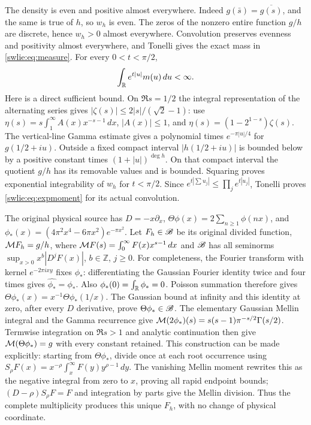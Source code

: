 \documentclass[11pt]{article}
\begin{document}
The density is even and positive almost everywhere. Indeed
$g(\bar s)=\overline{g(s)}$, and the same is true of $h$,
so $w_h$ is even. The zeros of the nonzero entire function
$g/h$ are discrete, hence $w_h>0$ almost everywhere.
Convolution preserves evenness and positivity almost everywhere,
and Tonelli gives the exact mass in \eqref{swlie:eq:measure}.
For every $0<t<\pi/2$,
\begin{equation}\label{swlie:eq:expmoment}
 \int_\mathbb R e^{t|u|}m(u)\,du<\infty.
\end{equation}
Here is a direct sufficient bound. On $\Re s=1/2$ the integral
representation of the alternating series gives
$|\zeta(s)|\leq2|s|/(\sqrt2-1)$: use
$\eta(s)=s\int_1^\infty A(x)x^{-s-1}\,dx$, $|A(x)|\leq1$,
and $\eta(s)=(1-2^{1-s})\zeta(s)$.
The vertical-line Gamma estimate gives a polynomial times
$e^{-\pi|u|/4}$ for $g(1/2+iu)$. Outside a fixed compact interval
$|h(1/2+iu)|$ is bounded below by a positive constant times
$(1+|u|)^{\deg h}$. On that compact interval the quotient
$g/h$ has its removable values and is bounded. Squaring proves
exponential integrability of $w_h$ for $t<\pi/2$.
Since $e^{t|\sum u_j|}\leq\prod_j e^{t|u_j|}$, Tonelli proves
\eqref{swlie:eq:expmoment} for its actual convolution.

The original physical source has $D=-x\partial_x$,
$\Theta\phi(x)=2\sum_{n\geq1}\phi(nx)$, and
$\phi_*(x)=(4\pi^2x^4-6\pi x^2)e^{-\pi x^2}$.
Let $F_h\in\mathscr B$ be its original divided function,
$\mathcal M F_h=g/h$, where $\mathcal M F(s)=\int_0^\infty F(x)x^{s-1}\,dx$
and $\mathscr B$ has all seminorms
$\sup_{x>0}x^b|D^jF(x)|$, $b\in\mathbb Z$, $j\geq0$.
For completeness, the Fourier transform with kernel
$e^{-2\pi ixy}$ fixes $\phi_*$: differentiating the Gaussian
Fourier identity twice and four times gives
$\widehat{\phi_*}=\phi_*$. Also $\phi_*(0)=\int_\mathbb R\phi_*=0$.
Poisson summation therefore gives
$\Theta\phi_*(x)=x^{-1}\Theta\phi_*(1/x)$.
The Gaussian bound at infinity and this identity at zero,
after every $D$ derivative, prove $\Theta\phi_*\in\mathscr B$.
The elementary Gaussian Mellin integral and the Gamma
recurrence give
$\mathcal M(2\phi_*)(s)=s(s-1)\pi^{-s/2}\Gamma(s/2)$.
Termwise integration on $\Re s>1$ and analytic continuation
then give $\mathcal M(\Theta\phi_*)=g$ with every constant retained.
This construction can be made explicitly: starting from
$\Theta\phi_*$, divide once at each root occurrence using
$S_\rho F(x)=x^{-\rho}\int_x^\infty F(y)y^{\rho-1}\,dy$.
The vanishing Mellin moment rewrites this as the negative
integral from zero to $x$, proving all rapid endpoint bounds;
$(D-\rho)S_\rho F=F$ and integration by parts give the Mellin
division. Thus the complete multiplicity produces this
unique $F_h$, with no change of physical coordinate.
\end{document}
